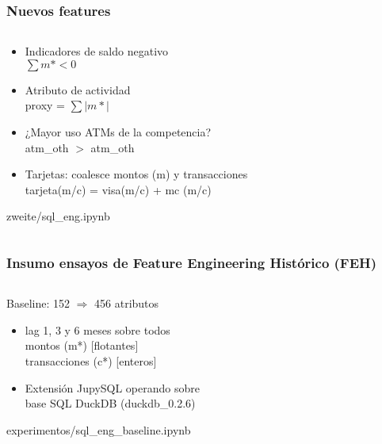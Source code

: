 \documentclass[aspectratio=169]{beamer} %
\begin{document}
\begin{frame}
  \frametitle{Nuevos features}
  \begin{columns}[onlytextwidth]
    \begin{column}{.6\textwidth}
      \begin{block}{}
        \begin{itemize}
          \item Indicadores de saldo negativo\\
          $\sum m* < 0$
          \item Atributo de actividad\\
          proxy = $\sum |m*|$
          \item ¿Mayor uso ATMs de la competencia?\\
          atm\_oth $>$ atm\_oth
          \item Tarjetas: coalesce montos (m) y transacciones\\
           tarjeta(m/c) = visa(m/c) + mc (m/c)
       \end{itemize}
        {\tiny zweite/sql\_eng.ipynb}
      \end{block}
   \end{column}
  \end{columns}
\end{frame}





\begin{frame}
  \frametitle{Insumo ensayos de Feature Engineering Histórico (FEH)}
  \begin{columns}[onlytextwidth]
    \begin{column}{.6\textwidth}
      \begin{block}{Baseline: 152 $\Rightarrow$ 456 atributos}
        \begin{itemize}
          \item lag 1, 3 y 6 meses sobre todos\\
          montos (m*) [flotantes]\\
          transacciones (c*) [enteros]
          \item Extensión JupySQL operando sobre\\base SQL DuckDB {\tiny (duckdb\_0.2.6)}
		    \end{itemize}
        {\tiny experimentos/sql\_eng\_baseline.ipynb}
      \end{block}

   \end{column}
  \end{columns}
\end{frame}
\end{document}

